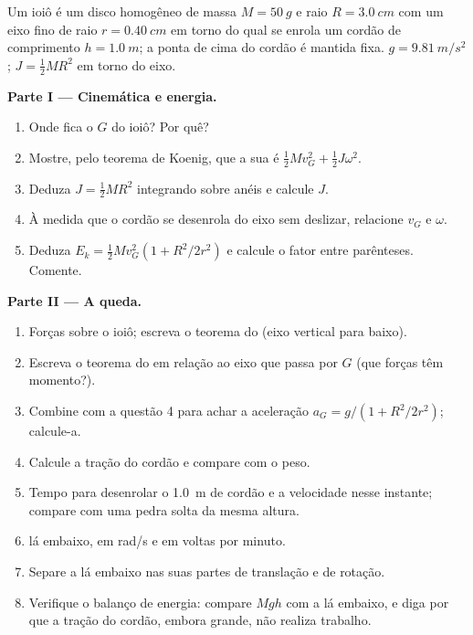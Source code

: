 \begin{problem}
\label{pb:b1:systems-of-points:1}
Um ioiô é um disco homogêneo de massa $M = \qty{50}{g}$ e raio $R =
\qty{3.0}{cm}$ com um eixo fino de raio $r = \qty{0.40}{cm}$ em torno do
qual se enrola um cordão de comprimento $h = \qty{1.0}{m}$; a ponta de cima
do cordão é mantida fixa. $g = \qty{9.81}{m/s^2}$; $J = \tfrac12 MR^2$ em torno do
eixo.

\medskip
\noindent\textbf{Parte I --- Cinemática e energia.}
\begin{enumerate}
  \item Onde fica o  $G$ do ioiô? Por quê?
  \item Mostre, pelo teorema de Koenig, que a sua  é $\tfrac12
        Mv_G^2 + \tfrac12 J\omega^2$.
  \item Deduza $J = \tfrac12 MR^2$ integrando sobre anéis e calcule
        $J$.
  \item À medida que o cordão se desenrola do eixo sem deslizar, relacione
        $v_G$ e $\omega$.
  \item Deduza $E_k = \tfrac12 Mv_G^2(1 + R^2/2r^2)$ e calcule o fator
        entre parênteses. Comente.
\end{enumerate}

\medskip
\noindent\textbf{Parte II --- A queda.}
\begin{enumerate}[resume]
  \item Forças sobre o ioiô; escreva o teorema do 
        (eixo vertical para baixo).
  \item Escreva o teorema do  em relação ao eixo que passa
        por $G$ (que forças têm momento?).
  \item Combine com a questão 4 para achar a aceleração $a_G = g/(1 +
        R^2/2r^2)$; calcule-a.
  \item Calcule a tração do cordão e compare com o peso.
  \item Tempo para desenrolar o \qty{1.0}{m} de cordão e a velocidade nesse
        instante; compare com uma pedra solta da mesma altura.
  \item {} lá embaixo, em rad/s e em voltas por minuto.
  \item Separe a  lá embaixo nas suas partes de translação
        e de rotação.
  \item Verifique o balanço de energia: compare $Mgh$ com a 
        lá embaixo, e diga por que a tração do cordão, embora grande,
        não realiza trabalho.
\end{enumerate}


\end{problem}
